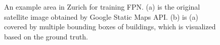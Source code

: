 \begin{figure}[!h]
	\centering
    \caption{An example area in Zurich for training FPN. (a) is the original satellite image obtained by Google Static Maps API. (b) is (a) covered by multiple bounding boxes of buildings, which is visualized based on the ground truth.}
	\label{fig:egareafpn}
\end{figure}